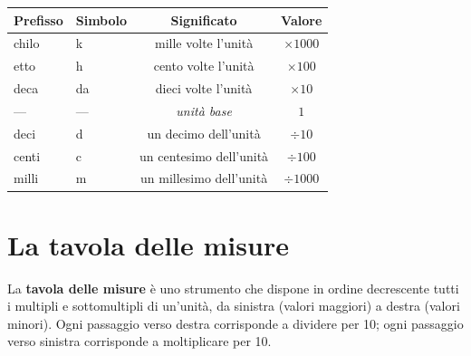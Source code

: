 \begin{center}
    \begin{tabular}{llcc}
        \toprule
        \textbf{Prefisso} & \textbf{Simbolo} & \textbf{Significato}    & \textbf{Valore} \\
        \midrule
        chilo             & k                & mille volte l'unità     & $\times 1000$   \\
        etto              & h                & cento volte l'unità     & $\times 100$    \\
        deca              & da               & dieci volte l'unità     & $\times 10$     \\
        —                 & —                & \textit{unità base}     & $1$             \\
        deci              & d                & un decimo dell'unità    & $\div 10$       \\
        centi             & c                & un centesimo dell'unità & $\div 100$      \\
        milli             & m                & un millesimo dell'unità & $\div 1000$     \\
        \bottomrule
    \end{tabular}
\end{center}

\section{La tavola delle misure}

\begin{definizione}
    La \textbf{tavola delle misure} è uno strumento che dispone in ordine decrescente tutti i multipli e sottomultipli di un'unità, da sinistra (valori maggiori) a destra (valori minori). Ogni passaggio verso destra corrisponde a dividere per 10; ogni passaggio verso sinistra corrisponde a moltiplicare per 10.
\end{definizione}

\begin{center}
\end{center}


